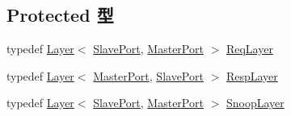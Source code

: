 \subsection*{Protected 型}
\begin{DoxyCompactItemize}
\item 
typedef \hyperlink{classBaseBus_1_1Layer}{Layer}$<$ \hyperlink{classSlavePort}{SlavePort}, \hyperlink{classMasterPort}{MasterPort} $>$ \hyperlink{classCoherentBus_ae15f02c0dca186fbfbd2f7b732e5b441}{ReqLayer}
\item 
typedef \hyperlink{classBaseBus_1_1Layer}{Layer}$<$ \hyperlink{classMasterPort}{MasterPort}, \hyperlink{classSlavePort}{SlavePort} $>$ \hyperlink{classCoherentBus_a40797c56ea5eaf481f56dfdc3ab1b399}{RespLayer}
\item 
typedef \hyperlink{classBaseBus_1_1Layer}{Layer}$<$ \hyperlink{classSlavePort}{SlavePort}, \hyperlink{classMasterPort}{MasterPort} $>$ \hyperlink{classCoherentBus_a73f554be8ad7076f9403bb35d6af14f1}{SnoopLayer}
\end{DoxyCompactItemize}
